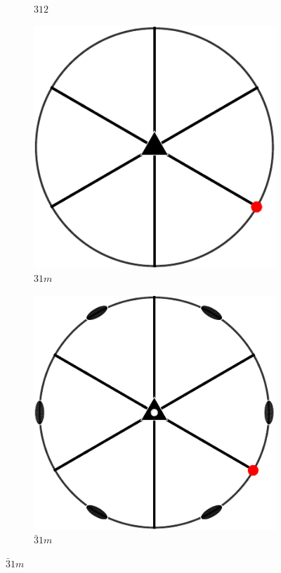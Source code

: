 \documentclass[compress]{beamer}
\begin{document}
\begin{frame}
\begin{figure}[H]
\begin{subfigure}{0.3\textwidth}
      \caption{$312$}
    \end{subfigure}
    \begin{subfigure}{0.3\textwidth}
      \includegraphics[width=\textwidth]{pic/sym31m}
      \caption{$31m$}
    \end{subfigure}
    \begin{subfigure}{0.3\textwidth}
      \includegraphics[width=\textwidth]{pic/sym-31m}
      \caption{$\bar 31m$}
    \end{subfigure}
  \end{figure}

\end{frame}
\end{document}
